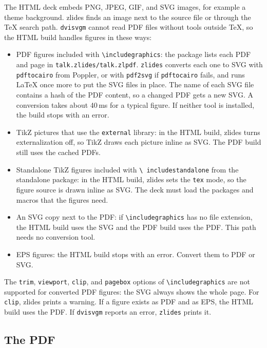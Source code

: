 \documentclass[11pt]{article}
\newcommand{\pkg}{\textsf{zlides}}
\newcommand{\cmd}[1]{\texttt{#1}}
\begin{document}
The HTML deck embeds PNG, JPEG, GIF, and SVG images, for example a theme
background. \pkg{} finds an image next to the source file or through the TeX
search path. \cmd{dvisvgm} cannot read PDF files without tools outside TeX, so
the HTML build handles figures in these ways:
\begin{itemize}
	\item PDF figures included with \cmd{\textbackslash includegraphics}: the
	      package lists each PDF and page in \cmd{talk.zlides/talk.zlpdf}.
	      \cmd{zlides} converts each one to SVG with \cmd{pdftocairo} from Poppler,
	      or with \cmd{pdf2svg} if \cmd{pdftocairo} fails, and runs LaTeX once more
	      to put the SVG files in place. The name of each SVG file contains a hash of
	      the PDF content, so a changed PDF gets a new SVG. A conversion takes about
	      40\,ms for a typical figure. If neither tool is installed, the build stops
	      with an error.
	\item TikZ pictures that use the \cmd{external} library: in the HTML build,
	      \pkg{} turns externalization off, so TikZ draws each picture inline as SVG.
	      The PDF build still uses the cached PDFs.
	\item Standalone TikZ figures included with \cmd{\textbackslash
		      includestandalone} from the \textsf{standalone} package: in the HTML build,
	      \pkg{} sets the \cmd{tex} mode, so the figure source is drawn inline as
	      SVG. The deck must load the packages and macros that the figures need.
	\item An SVG copy next to the PDF: if \cmd{\textbackslash includegraphics}
	      has no file extension, the HTML build uses the SVG and the PDF build uses
	      the PDF. This path needs no conversion tool.
	\item EPS figures: the HTML build stops with an error. Convert them to PDF
	      or SVG.
\end{itemize}
The \cmd{trim}, \cmd{viewport}, \cmd{clip}, and \cmd{pagebox} options of
\cmd{\textbackslash includegraphics} are not supported for converted PDF figures:
the SVG always shows the whole page. For \cmd{clip}, \pkg{} prints a warning. If
a figure exists as PDF and as EPS, the HTML build uses the PDF. If \cmd{dvisvgm} reports an error,
\cmd{zlides} prints it.

\subsection{The PDF}
\end{document}
